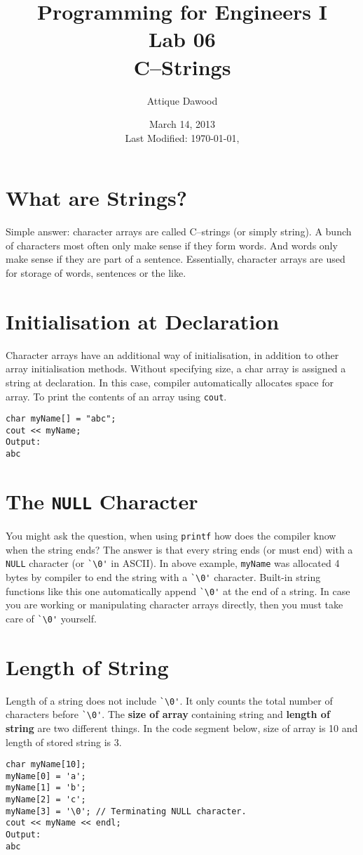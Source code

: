 \documentclass[12pt,a4paper]{article}
\title{\vspace{-1cm}Programming for Engineers I\\Lab 06\\C--Strings}
\author{Attique Dawood}
\date{March 14, 2013\\[0.2cm] Last Modified: \today, \currenttime}
\begin{document}
\maketitle
\section{What are Strings?}
Simple answer: character arrays are called C--strings (or simply string). A bunch of characters most often only make sense if they form words. And words only make sense if they are part of a sentence. Essentially, character arrays are used for storage of words, sentences or the like.
\section{Initialisation at Declaration}
Character arrays have an additional way of initialisation, in addition to other array initialisation methods. Without specifying size, a char array is assigned a string at declaration. In this case, compiler automatically allocates space for array. To print the contents of an array using \texttt{cout}.
\begin{lstlisting}
char myName[] = "abc";
cout << myName;
Output:
abc
\end{lstlisting}
\section{The \texttt{NULL} Character}
You might ask the question, when using \texttt{printf} how does the compiler know when the string ends? The answer is that every string ends (or must end) with a \texttt{NULL} character (or \verb|`\0'| in ASCII). In above example, \texttt{myName} was allocated 4 bytes by compiler to end the string with a \verb|`\0'| character. Built-in string functions like this one automatically append \verb|`\0'| at the end of a string. In case you are working or manipulating character arrays directly, then you must take care of \verb|`\0'| yourself.
\section{Length of String}
Length of a string does not include \verb|`\0'|. It only counts the total number of characters before \verb|`\0'|. The \textbf{size of array} containing string and \textbf{length of string} are two different things. In the code segment below, size of array is 10 and length of stored string is 3.
\begin{lstlisting}
char myName[10];
myName[0] = 'a';
myName[1] = 'b';
myName[2] = 'c';
myName[3] = '\0'; // Terminating NULL character.
cout << myName << endl;
Output:
abc
\end{lstlisting}
\end{document}

